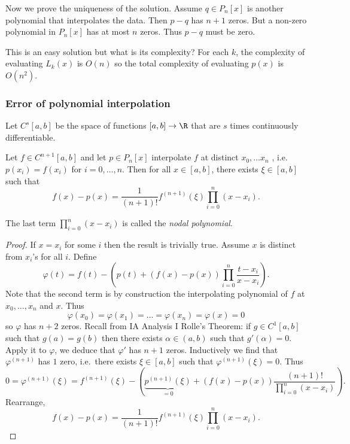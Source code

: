 \documentclass[a4paper]{article}
\begin{document}
Now we prove the uniqueness of the solution. Assume \(q \in P_n[x]\) is another polynomial that interpolates the data. Then \(p - q\) has \(n + 1\) zeros. But a non-zero polynomial in \(P_n[x]\) has at most \(n\) zeros. Thus \(p - q\) must be zero.

This is an easy solution but what is its complexity? For each \(k\), the complexity of evaluating \(L_k(x)\) is \(O(n)\) so the total complexity of evaluating \(p(x)\) is \(O(n^2)\).

\subsubsection{Error of polynomial interpolation}

Let \(C^s[a, b]\) be the space of functions \([a, b] \to \R\) that are \(s\) times continuously differentiable.

\begin{theorem}
  Let \(f \in C^{n + 1}[a, b]\) and let \(p \in P_n[x]\) interpolate \(f\) at distinct \(x_0, \dots x_n\) , i.e.\ \(p(x_i) = f(x_i)\) for \(i = 0, \dots, n\). Then for all \(x \in [a, b]\), there exists \(\xi \in [a, b]\) such that
  \[
    f(x) - p(x) = \frac{1}{(n + 1)!} f^{(n + 1)}(\xi) \prod_{i = 0}^n (x - x_i).
  \]
\end{theorem}

The last term \(\prod_{i = 0}^n (x - x_i)\) is called the \emph{nodal polynomial}.

\begin{proof}
  If \(x = x_i\) for some \(i\) then the result is trivially true. Assume \(x\) is distinct from \(x_i\)'s for all \(i\). Define
  \[
    \varphi(t) = f(t) - \left(p(t) + (f(x) - p(x)) \prod_{i = 0}^n \frac{t - x_i}{x - x_i} \right).
  \]
  Note that the second term is by construction the interpolating polynomial of \(f\) at \(x_0, \dots, x_n\) and \(x\). Thus
  \[
    \varphi(x_0) = \varphi(x_1) = \dots = \varphi(x_n) = \varphi(x) = 0
  \]
  so \(\varphi\) has \(n + 2\) zeros. Recall from IA Analysis I Rolle's Theorem: if \(g \in C^1[a, b]\) such that \(g(a) = g(b)\) then there exists \(\alpha \in (a, b)\) such that \(g'(\alpha) = 0\). Apply it to \(\varphi\), we deduce that \(\varphi'\) has \(n + 1\) zeros. Inductively we find that \(\varphi^{(n + 1)}\) has \(1\) zero, i.e.\ there exists \(\xi \in [a, b]\) such that \(\varphi^{(n + 1)}(\xi) = 0\). Thus
  \[
    0 = \varphi^{(n + 1)}(\xi) = f^{(n + 1)}(\xi) - \left( \underbrace{p^{(n + 1)}(\xi)}_{= 0} + (f(x) - p(x)) \frac{(n + 1)!}{\prod_{i = 0}^n(x - x_i)} \right).
  \]
  Rearrange,
  \[
    f(x) - p(x) = \frac{1}{(n + 1)!}f^{(n + 1)}(\xi) \prod_{i = 0}^n(x - x_i).
  \]
\end{proof}
\end{document}

